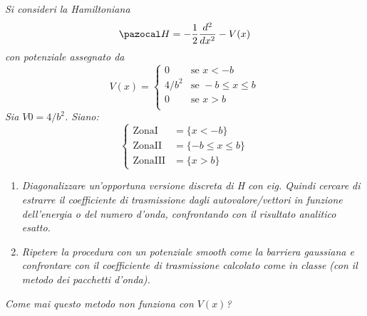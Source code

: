 \textit{Si consideri la Hamiltoniana
$$ \Hh = -\frac{1}{2} \frac{ d^2}{dx^2} - V(x) $$
con potenziale assegnato da
$$
V(x)  = \begin{cases}
        0       & \mbox{se } x<-b \\
        4/b^2   & \mbox{se } -b \leq x \leq b \\
        0       & \mbox{se } x>b \\
         \end{cases}
$$
Sia $V0 = 4/b^2$. Siano:
$$
\begin{cases}
    \mbox{ZonaI} & = \{x<-b \} \\
    \mbox{ZonaII} & = \{-b \leq x \leq b\} \\
    \mbox{ZonaIII} & = \{x>b\}
\end{cases} $$
}%
\begin{enumerate}
  \item \textit{Diagonalizzare un'opportuna versione discreta di H con eig. Quindi cercare di
  estrarre il coefficiente di trasmissione dagli autovalore/vettori in funzione dell'energia
  o del numero d'onda, confrontando con il risultato analitico esatto.}

  \item \textit{Ripetere la procedura con un potenziale smooth come la barriera gaussiana e confrontare con il coefficiente di trasmissione calcolato come in classe (con il metodo
  dei pacchetti d'onda).}
\end{enumerate}

\textit{Come mai questo metodo non funziona con $V(x)$?}
